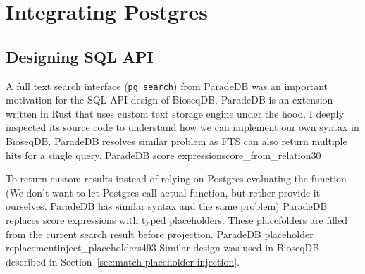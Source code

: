\section{Integrating Postgres}
\label{sec:mmsearch-sql-rendezvous}



\subsection{Designing SQL API}

A full text search interface (\texttt{pg\_search}) from ParadeDB was an important motivation for the SQL API design of BioseqDB. 
ParadeDB is an extension written in Rust that uses custom text storage engine under the hood. I deeply inspected its source code to understand how we can implement our own syntax in BioseqDB.
ParadeDB resolves similar problem as FTS can also return multiple hits for a single query.
{ParadeDB score expression}{score_from_relation}{30}

To return custom results instead of relying on Postgres evaluating the function (We don't want to let Postgres call actual  function, but rether provide it ourselves. ParadeDB has similar syntax and the same problem)
 ParadeDB replaces score expressions with typed placeholders.
These placefolders are filled from the current search result before projection.
  {ParadeDB placeholder replacement}{inject_placeholders}{493}
Similar design was used in BioseqDB - described in Section~\ref{sec:match-placeholder-injection}.

